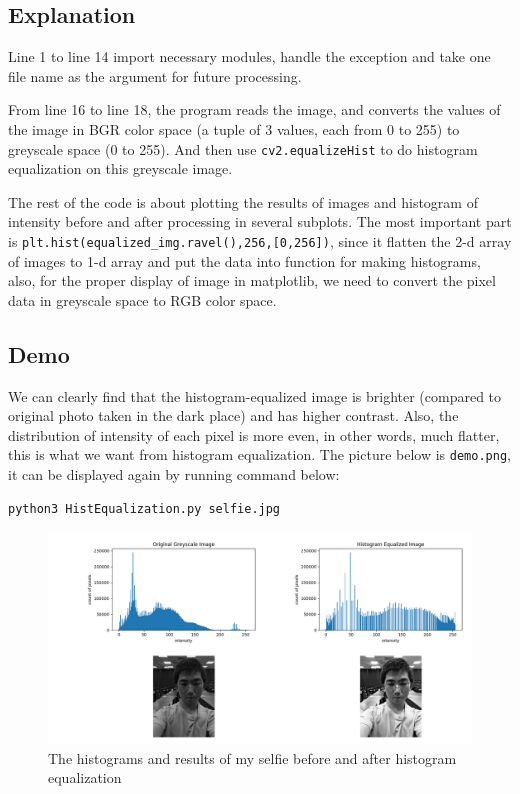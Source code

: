 \documentclass[12pt]{article}
\begin{document}
\subsection{Explanation}
Line 1 to line 14 import necessary modules, handle the exception and take one file name as the argument for future processing.

From line 16 to line 18, the program reads the image, and converts the values of the image in BGR color space (a tuple of 3 values, each from 0 to 255) to greyscale space (0 to 255). And then use \texttt{cv2.equalizeHist} to do histogram equalization on this greyscale image.

The rest of the code is about plotting the results of images and histogram of intensity before and after processing in several subplots. The most important part is \texttt{plt.hist(equalized\_img.ravel(),256,[0,256])}, since it flatten the 2-d array of images to 1-d array and put the data into function for making histograms, also, for the proper display of image in matplotlib, we need to convert the pixel data in greyscale space to RGB color space.
\subsection{Demo}
We can clearly find that the histogram-equalized image is brighter (compared to original photo taken in the dark place) and has higher contrast. Also, the distribution of intensity of each pixel is more even, in other words, much flatter, this is what we want from histogram equalization. The picture below is \texttt{demo.png}, it can be displayed again by running command below:
\begin{Verbatim}[linenos]
python3 HistEqualization.py selfie.jpg
\end{Verbatim}
\begin{figure}[H]
    \centering
    \includegraphics[width=1\linewidth]{demo.png}
    \caption{The histograms and results of my selfie before and after 
histogram equalization}
\end{figure}
\end{document}
